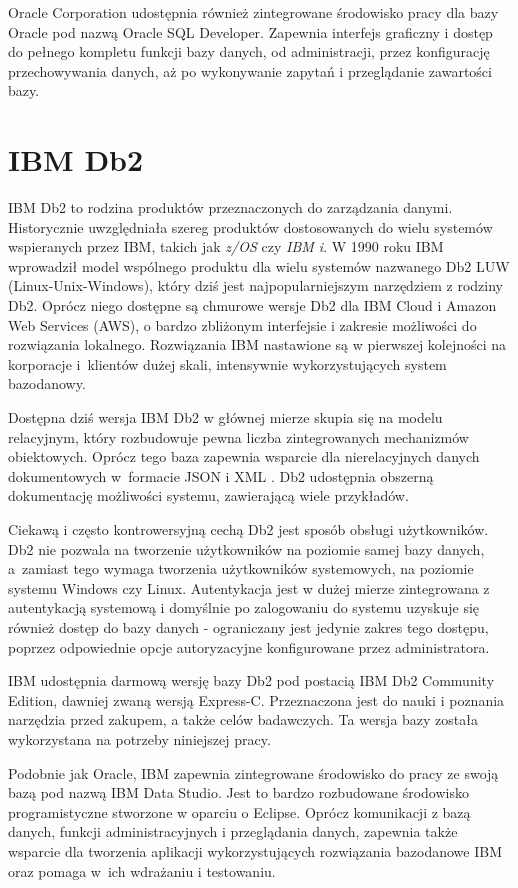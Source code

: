 \documentclass[a4paper,twoside,12pt]{book}
\begin{document}
Oracle Corporation udostępnia również zintegrowane środowisko pracy dla bazy Oracle pod nazwą Oracle SQL Developer. Zapewnia interfejs graficzny i dostęp do pełnego kompletu funkcji bazy danych, od administracji, przez konfigurację przechowywania danych, aż po wykonywanie zapytań i przeglądanie zawartości bazy. 

\section{IBM Db2}

IBM Db2 to rodzina produktów przeznaczonych do zarządzania danymi. Historycznie uwzględniała szereg produktów dostosowanych do wielu systemów wspieranych przez IBM, takich jak \textit{z/OS} czy \textit{IBM i}. W 1990 roku IBM wprowadził model wspólnego produktu dla wielu systemów nazwanego Db2 LUW (Linux-Unix-Windows), który dziś jest najpopularniejszym narzędziem z rodziny Db2. Oprócz niego dostępne są chmurowe wersje Db2 dla IBM Cloud i Amazon Web Services (AWS), o bardzo zbliżonym interfejsie i zakresie możliwości do rozwiązania lokalnego. Rozwiązania IBM nastawione są w pierwszej kolejności na korporacje i~klientów dużej skali, intensywnie wykorzystujących system bazodanowy. 

Dostępna dziś wersja IBM Db2 w głównej mierze skupia się na modelu relacyjnym, który rozbudowuje pewna liczba zintegrowanych mechanizmów obiektowych. Oprócz tego baza zapewnia wsparcie dla nierelacyjnych danych dokumentowych w~formacie JSON i XML \cite{bib:db2-book}. Db2 udostępnia obszerną dokumentację możliwości systemu, zawierającą wiele przykładów.

Ciekawą i często kontrowersyjną cechą Db2 jest sposób obsługi użytkowników. Db2 nie pozwala na tworzenie użytkowników na poziomie samej bazy danych, a~zamiast tego wymaga tworzenia użytkowników systemowych, na poziomie systemu Windows czy Linux. Autentykacja jest w dużej mierze zintegrowana z autentykacją systemową i domyślnie po zalogowaniu do systemu uzyskuje się również dostęp do bazy danych - ograniczany jest jedynie zakres tego dostępu, poprzez odpowiednie opcje autoryzacyjne konfigurowane przez administratora.

IBM udostępnia darmową wersję bazy Db2 pod postacią IBM Db2 Community Edition, dawniej zwaną wersją Express-C. Przeznaczona jest do nauki i poznania narzędzia przed zakupem, a także celów badawczych. Ta wersja bazy została wykorzystana na potrzeby niniejszej pracy.

Podobnie jak Oracle, IBM zapewnia zintegrowane środowisko do pracy ze swoją bazą pod nazwą IBM Data Studio. Jest to bardzo rozbudowane środowisko programistyczne stworzone w oparciu o Eclipse. Oprócz komunikacji z bazą danych, funkcji administracyjnych i przeglądania danych, zapewnia także wsparcie dla tworzenia aplikacji wykorzystujących rozwiązania bazodanowe IBM oraz pomaga w~ich wdrażaniu i testowaniu.
\end{document}
